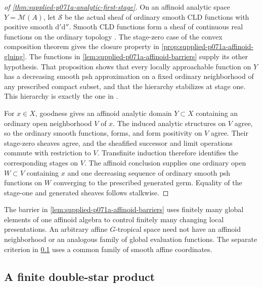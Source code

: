 \begin{proof}[of \cref{thm:supplied-p071a-analytic-first-stage}]
On an affinoid analytic space $Y=\mathcal{M}(A)$, let $\mathscr{S}$ be the actual sheaf of ordinary smooth CLD functions with positive smooth $\mathrm{d}'\mathrm{d}''$. Smooth CLD functions form a sheaf of continuous real functions on the ordinary topology \cite[\S6.2.1--6.2.2]{CLD25}. The stage-zero case of the convex composition theorem \cite[Proposition~8.2.1]{CLD25} gives the closure property in \cref{prop:supplied-p071a-affinoid-gluing}. The functions in \cref{lem:supplied-p071a-affinoid-barriers} supply its other hypothesis. That proposition shows that every locally approachable function on $Y$ has a decreasing smooth psh approximation on a fixed ordinary neighborhood of any prescribed compact subset, and that the hierarchy stabilizes at stage one. This hierarchy is exactly the one in \cite[Definition~8.1.1 and Lemma~8.1.4]{CLD25}.

For $x\in X$, goodness gives an affinoid analytic domain $Y\subset X$ containing an ordinary open neighborhood $V$ of $x$. The induced analytic structures on $V$ agree, so the ordinary smooth functions, forms, and form positivity on $V$ agree. Their stage-zero sheaves agree, and the sheafified successor and limit operations commute with restriction to $V$. Transfinite induction therefore identifies the corresponding stages on $V$. The affinoid conclusion supplies one ordinary open $W\subset V$ containing $x$ and one decreasing sequence of ordinary smooth psh functions on $W$ converging to the prescribed generated germ. Equality of the stage-one and generated sheaves follows stalkwise.
\end{proof}

\begin{remark}
\label{rem:supplied-p071a-scope}
The barrier in \cref{lem:supplied-p071a-affinoid-barriers} uses finitely many global elements of one affinoid algebra to control finitely many changing local presentations. An arbitrary affine $G$-tropical space need not have an affinoid neighborhood or an analogous family of global evaluation functions. The separate criterion in \cref{sec:supplied-p071a-double-star} uses a common family of smooth affine coordinates.
\end{remark}

\subsection{A finite double-star product}
\label{sec:supplied-p071a-double-star}

